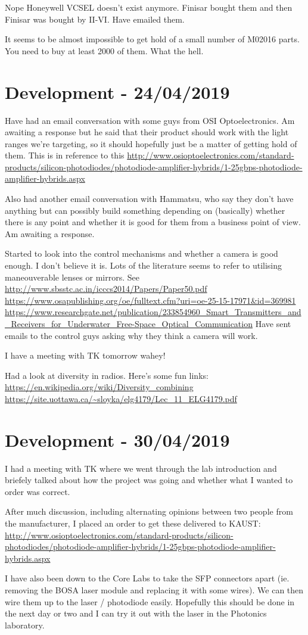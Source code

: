 Nope Honeywell VCSEL doesn't exist anymore. Finisar bought them and then Finisar
was bought by II-VI. Have emailed them.

It seems to be almost impossible to get hold of a small number of M02016 parts.
You need to buy at least 2000 of them. What the hell.

\section{Development - 24/04/2019}
Have had an email conversation with some guys from OSI Optoelectronics.
Am awaiting a response but he said that their product should work with the
light ranges we're targeting, so it should hopefully just be a matter of getting
hold of them. This is in reference to this
\url{http://www.osioptoelectronics.com/standard-products/silicon-photodiodes/photodiode-amplifier-hybrids/1-25gbps-photodiode-amplifier-hybrids.aspx}

Also had another email conversation with Hammatsu, who say they don't have
anything but can possibly build something depending on (basically) whether there
is any point and whether it is good for them from a business point of view.
Am awaiting a response.

Started to look into the control mechanisms and whether a camera is good
enough. I don't believe it is. Lots of the literature seems to refer to
utilising maneouverable lenses or mirrors. See
\url{http://www.sbsstc.ac.in/icccs2014/Papers/Paper50.pdf}
\url{https://www.osapublishing.org/oe/fulltext.cfm?uri=oe-25-15-17971&id=369981}
\url{https://www.researchgate.net/publication/233854960_Smart_Transmitters_and_Receivers_for_Underwater_Free-Space_Optical_Communication}
Have sent emails to the control guys asking why they think a camera will
work.

I have a meeting with TK tomorrow wahey!

Had a look at diversity in radios. Here's some fun links:
\url{https://en.wikipedia.org/wiki/Diversity_combining}
\url{https://site.uottawa.ca/~sloyka/elg4179/Lec_11_ELG4179.pdf}

\section{Development - 30/04/2019}
I had a meeting with TK where we went through the lab introduction
and briefely talked about how the project was going and whether what
I wanted to order was correct.

After much discussion, including alternating opinions between two
people from the manufacturer, I placed an order to get these delivered
to KAUST:
\url{http://www.osioptoelectronics.com/standard-products/silicon-photodiodes/photodiode-amplifier-hybrids/1-25gbps-photodiode-amplifier-hybrids.aspx}

I have also been down to the Core Labs to take the SFP
connectors apart (ie. removing the \ac{BOSA} laser module
and replacing it with some wires). We can then wire them
up to the laser / photodiode easily. Hopefully this should
be done in the next day or two and I can try it out with
the laser in the Photonics laboratory.